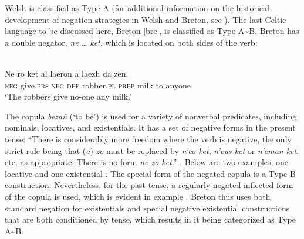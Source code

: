 \documentclass[output=paper,colorlinks,citecolor=brown]{langscibook}
\begin{document}
%
Welsh is classified as Type A (for additional information on the
historical development of negation strategies in Welsh and Breton, see
\citealt{Willis2013}). The last Celtic language to be discussed here,
Breton [bre], is classified as Type A{\textasciitilde}B. Breton has a double negator, \textit{ne … ket}, which is located on both sides of the verb:
%
\begin{exe}\ex
{}\\
    \gll Ne ro ket al laeron a laezh da zen. \\
\textsc{neg} give.\textsc{prs} \textsc{neg} \textsc{def} robber.\textsc{pl} \textsc{prep} milk  to anyone \\
    \glt `The robbers give no-one any milk.' 
    \end{exe}
%
The copula \textit{bezañ} (`to be') \parencite[144ff]{Press1986} is used
for a variety of nonverbal predicates, including nominals, locatives, and
existentials. It has a set of negative forms in the present tense: “There
is considerably more freedom where the verb is negative, the only strict
rule being that (\textit{a}) \textit{zo} must be replaced by \textit{n'eo
ket}, \textit{n'eus ket} or \textit{n'eman ket}, etc. as appropriate. There
is no form \textit{ne zo ket}.” \citep[152]{Press1986}. Below are two
examples, one locative  and one existential
. The special form of the negated copula is a
Type B construction. Nevertheless, for the past tense, a regularly negated
inflected form of the copula is used, which is evident in example
. Breton thus uses both standard negation for existentials and special negative existential constructions that are both conditioned by tense, which results in it being categorized as Type A{\textasciitilde}B.
%
\end{document}
